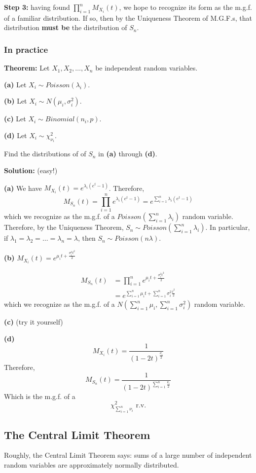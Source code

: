 \documentclass[12pt]{article}
\begin{document}
\textbf{Step 3:} having found $\prod_{i = 1}^n M_{X_i} (t)$, we hope to recognize its form as the m.g.f. of a familiar distribution. If so, then by the Uniqueness Theorem of M.G.F.s, that distribution \textbf{must be} the distribution of $S_n$. 

\subsubsection{In practice}
\textbf{Theorem:} Let $X_1, X_2, \dots, X_n$ be independent random variables. 

\textbf{(a)} Let $X_i \sim Poisson (\lambda_i)$. 

\textbf{(b)} Let $X_i \sim N(\mu_i, \sigma_i^2)$.

\textbf{(c)} Let $X_i \sim Binomial (n_i, p)$.

\textbf{(d)} Let $X_i \sim \chi_{\nu_i}^2$.

Find the distributions of of $S_n$ in \textbf{(a)} through \textbf{(d)}.

\textbf{Solution:} (easy!)

\textbf{(a)} We have $M_{X_i} (t) = e^{\lambda_i (e^t - 1)}$. Therefore, 
\[
   M_{S_n} (t) = \prod_{i=1}^n e^{\lambda_i (e^t -1)} = e^{\sum_{i=1}^n \lambda_i (e^t - 1)} 
\]
which we recognize as the m.g.f. of a $Poisson(\sum_{i = 1}^n \lambda_i)$ random variable. Therefore, by the Uniqueness Theorem, $S_n \sim Poisson(\sum_{i = 1}^n \lambda_i)$. In particular, if $\lambda_1 = \lambda_2 = \dots = \lambda_n = \lambda$, then $S_n \sim Poisson(n \lambda)$.

\textbf{(b)} $M_{X_i} (t) = e^{\mu_i t + \frac{\sigma_i^2 t^2}{2}}$

\begin{align*}
    M_{S_n} (t) &= \prod_{i = 1}^n e^{\mu_i t + \frac{\sigma_i^2 t^2}{2}} \\
        &= e^{\sum_{i=1}^n \mu_i t + \sum_{i = 1}^n \sigma_i^2 \frac{t^2}{2}}
\end{align*}
which we recognize as the m.g.f. of a $N(\sum_{i = 1}^n \mu_i, \sum_{i = 1}^n \sigma_i^2)$ random variable.

\textbf{(c)} (try it yourself)

\textbf{(d)} 
$$
    M_{X_i}(t) = \frac{1}{(1-2t)^{\frac{\nu_i}{2}}}
$$
Therefore,
\[
	M_{S_n}(t) = \frac{1}{(1-2t)^{\sum_{i=1}^n \frac{\nu_i}{2}}}
\]
Which is the m.g.f. of a 
$$ 
    \chi_{\sum_{i=1}^n \nu_i}^2 \text{ r.v.}
$$

\subsection{The Central Limit Theorem}
Roughly, the Central Limit Theorem says: sums of a large number of independent random variables are approximately normally distributed.
\end{document}
